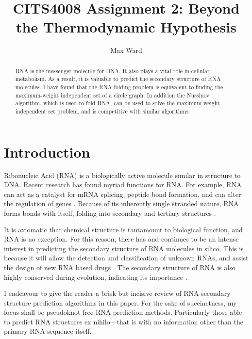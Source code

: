 \documentclass[12pt, a4paper]{article}
\title{CITS4008 Assignment 2: Beyond the Thermodynamic Hypothesis}
\author{Max Ward}
\begin{document}
\maketitle

\begin{abstract}
RNA is the messenger molecule for DNA. It also plays a vital role in cellular metabolism. As a result, it is valuable to predict the secondary structure of RNA molecules. I have found that the RNA folding problem is equivalent to finding the maximum-weight independent set of a circle graph. In addition the Nussinov algorithm, which is used to fold RNA, can be used to solve the maximum-weight independent set problem, and is competitive with similar algorithms.
\end{abstract}

\tableofcontents
\clearpage

\section*{Introduction} 
Ribonucleic Acid (RNA) is a biologically active molecule similar in structure to DNA. Recent research has found myriad functions for RNA. For example, RNA can act as a catalyst for mRNA splicing, peptide bond formation, and can alter the regulation of genes
\cite{xu2012statistical}. Because of its inherently single stranded nature, RNA forms bonds with itself, folding into
secondary and tertiary structures \cite{conn1998rna}.

It is axiomatic that chemical structure is tantamount to biological function, and RNA is no exception. For this reason, there has and continues to be an intense
interest in predicting the secondary structure of RNA
molecules in silico. This is  because it will allow the detection and classification of unknown RNAs, and assist the design of new RNA based drugs \cite{condon2003problems}. The secondary structure of RNA
is also highly conserved during evolution, indicating its importance \cite{hofacker2008rna}.

I endeavour to give the reader a brisk but incisive review of RNA secondary structure prediction algorithms in this paper. For the sake of succinctness, my focus shall be pseudoknot-free RNA prediction methods. Particularly those able to predict RNA structures ex nihilo---that is with no information other than the primary RNA sequence itself.
\end{document}
